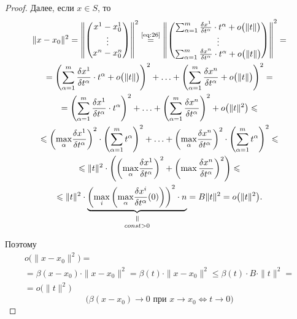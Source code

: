 \begin{proof}
    Далее, если $x\in S$, то
    \begin{multline*}
        \|x-x_0\|^2 = \left\|\left(\begin{matrix}
                x^1 - x_0^1 \\
                \vdots      \\
                x^n - x^n_0
            \end{matrix}\right)\right\|^2 \overset{\text{\ref{eq:26}}}{=} \left\|\left(\begin{matrix}
                \sum_{\alpha=1}^{m}\frac{\delta x^1}{\delta t^\alpha}\cdot t^\alpha + o\big(\|t\|\big) \\
                \vdots                                                                                 \\
                \sum_{\alpha=1}^{m}\frac{\delta x^n}{\delta t^\alpha}\cdot t^\alpha + o\big(\|t\|\big)
            \end{matrix}\right)\right\|^2 = \\
        = \left(\sum_{\alpha = 1}^{m}\frac{\delta x^1}{\delta t^\alpha}\cdot t^\alpha + o\big(\|t\|\big)\right)^2 + \ldots + \left(\sum_{\alpha=1}^{m}\frac{\delta x^n}{\delta t^\alpha} + o\big(\|t\|\big)\right)^2 =\\
        = \left(\sum_{\alpha = 1}^{m}\frac{\delta x^1}{\delta t^\alpha}\cdot t^\alpha \right)^2 + \ldots + \left(\sum_{\alpha=1}^{m}\frac{\delta x^n}{\delta t^\alpha} \right)^2 + o\big(\|t\|^2\big) \leqslant \\
        \leqslant \left( \underset{\alpha}{\max}\frac{\delta x^1}{\delta t^\alpha}\right)^2 \cdot \left(\sum_{\alpha=1}^{m} t^\alpha\right)^2 + \ldots + \left(\underset{\alpha}{\max}\frac{\delta x^n}{\delta t^\alpha}\right)^2\cdot\left(\sum_{\alpha=1}^{m}t^\alpha\right)^2 \leqslant \\
        \leqslant \|t\|^2 \cdot \left(\left(\underset{\alpha}{\max}\frac{\delta x^1}{\delta t^\alpha}\right)^2 + \left(\max \frac{\delta x^n}{\delta t^\alpha}\right)^2\right) \leqslant \\
        \leqslant \|t\|^2 \cdot \equalto{\underbrace{\left(\underset{i}{\max}\left(\underset{\alpha}{\max}\frac{\delta x^i}{\delta t^\alpha}(0)\right)\right)^2 \cdot n}}{const>0} = B\|t\|^2 = o\big(\|t\|^2\big).
    \end{multline*}

    Поэтому
    \begin{multline*}
        o\big(\|x-x_0\|^2\big) = \\
        = \beta(x-x_0)\cdot \|x-x_0\|^2 = \beta(t)\cdot \|x-x_0\|^2 \leqslant \beta(t) \cdot B \cdot \|t\|^2 = \\
        = o\big(\|t\|^2\big)
    \end{multline*}
    \[
        \big(\beta(x-x_0)\rightarrow0\text{ при }x \rightarrow x_0 \iff t \rightarrow 0\big)
    \]
\end{proof}